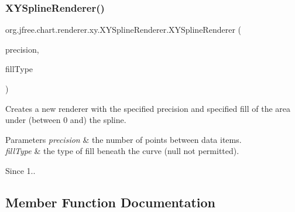 \subsubsection{\texorpdfstring{X\+Y\+Spline\+Renderer()}{XYSplineRenderer()}\hspace{0.1cm}{\footnotesize\ttfamily [3/3]}}
{\footnotesize\ttfamily org.\+jfree.\+chart.\+renderer.\+xy.\+X\+Y\+Spline\+Renderer.\+X\+Y\+Spline\+Renderer (\begin{DoxyParamCaption}\item[{int}]{precision,  }\item[{Fill\+Type}]{fill\+Type }\end{DoxyParamCaption})}

Creates a new renderer with the specified precision and specified fill of the area \textquotesingle{}under\textquotesingle{} (between \textquotesingle{}0\textquotesingle{} and) the spline.


\begin{DoxyParams}{Parameters}
{\em precision} & the number of points between data items. \\
\hline
{\em fill\+Type} & the type of fill beneath the curve ({\ttfamily null} not permitted).\\
\hline
\end{DoxyParams}
\begin{DoxySince}{Since}
1.. 
\end{DoxySince}


\subsection{Member Function Documentation}
\mbox{\label{classorg_1_1jfree_1_1chart_1_1renderer_1_1xy_1_1_x_y_spline_renderer_a0536eed3cfdb48f0ff43aa1c0d808f99}} 
